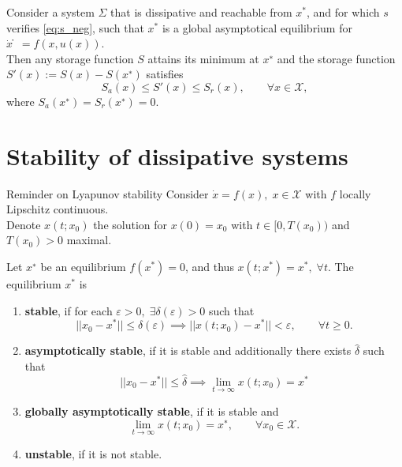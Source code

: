 \documentclass[aspectratio=169]{beamer}
\begin{document}
\begin{frame}
\begin{corollary}
	Consider a system $\Sigma$ that is dissipative and reachable from $x^*$, and for which $s$ verifies \eqref{eq:s_neg}, such that $x^*$ is a
	global asymptotical equilibrium for $\dot{x}̇=f(x, u(x))$.\\
	
	Then any storage function $S$ 	attains its minimum at $x^∗$ and the storage function $S'(x) := S(x) − S(x^∗)$ satisfies
	\begin{equation*}
		S_a(x) \le S'(x) \le S_r(x), \qquad \forall x \in \mathcal{X},
	\end{equation*}
	where $S_a(x^∗) = S_r (x^∗) = 0$.
\end{corollary}
\end{frame}

\section{Stability of dissipative systems}

\begin{frame}{Reminder on Lyapunov stability}
Consider $\dot{x}=f(x), \; x \in \mathcal{X}$ with $f$ locally Lipschitz continuous.\\
Denote $x(t; x_0)$ the solution for $x(0)=x_0$ with $t \in [0, T(x_0))$ and $T(x_0)>0$ maximal.

\begin{definition}[Stability]
	Let $x^∗$ be an equilibrium $f(x^*) = 0$, and thus
	$x(t; x^*) = x^*, \; \forall t$. The equilibrium $x^*$ is
	\begin{enumerate}
	 \item \textbf{stable}, if for each $\varepsilon>0, \; \exists \delta(\varepsilon)>0$ such that
	 \begin{equation*}
	 	||x_0 - x^*|| \le \delta(\varepsilon) \implies ||x(t; x_0) - x^*||< \varepsilon, \qquad \forall t \ge 0.
	 \end{equation*}
	 \item \textbf{asymptotically stable}, if it is stable and additionally there exists $\widehat{\delta}$ such that
	 \begin{equation*}
	 	||x_0 - x^*|| \le \widehat{\delta} \implies \lim_{t \rightarrow \infty} x(t; x_0) = x^*
	 \end{equation*}
	 \item \textbf{globally asymptotically stable}, if it is stable and 
	 $$\lim_{t \rightarrow \infty} x(t; x_0) = x^∗, \qquad \forall x_0 \in \mathcal{X}.$$
	 \item \textbf{unstable}, if it is not stable.
	\end{enumerate}
\end{definition}

\end{frame}
\end{document}
